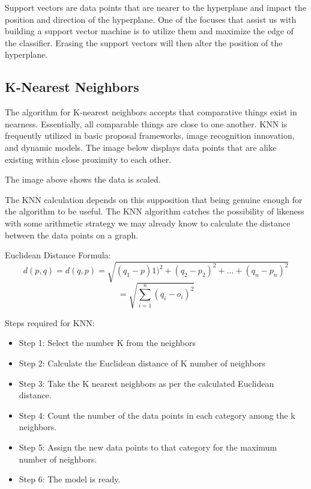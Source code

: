 \documentclass[a4paper,12pt]{report}
\begin{document}
Support vectors are data points that are nearer to the hyperplane and impact the position and direction of the hyperplane. One of the focuses that assist us with building a support vector machine is to utilize them and maximize the edge of the classifier. Erasing the support vectors will then alter the position of the hyperplane.

\subsection{K-Nearest Neighbors}
 
The algorithm for K-nearest neighbors accepts that comparative things exist in nearness. Essentially, all comparable things are close to one another. KNN is frequently utilized in basic proposal frameworks, image recognition innovation, and dynamic models. The image below displays data points that are alike existing within close proximity to each other.


The image above shows the data is scaled.


The KNN calculation depends on this supposition that being genuine enough for the algorithm to be useful. The KNN algorithm catches the possibility of likeness with some arithmetic strategy we may already know to calculate the distance between the data points on a graph.


Euclidean Distance Formula:
$$d(p,q)=d(q,p)=\sqrt{(q_1-p)1)^2+(q_2-p_2)^2+...+(q_n-p_n)^2}$$
$$=\sqrt{\sum_{i=1}^n(q_i-o_i)^2}$$

Steps required for KNN:
\vspace*{-.9cm}
\begin{itemize}[,]
    \setlength\itemsep{-.1cm}
    \item Step 1: Select the number K from the neighbors
    \item Step 2: Calculate the Euclidean distance of K number of neighbors
    \item Step 3: Take the K nearest neighbors as per the calculated Euclidean distance.
    \item Step 4: Count the number of the data points in each category among the k neighbors.
    \item Step 5: Assign the new data points to that category for the maximum number of neighbors.
    \item Step 6: The model is ready.
\end{itemize}
\end{document}
